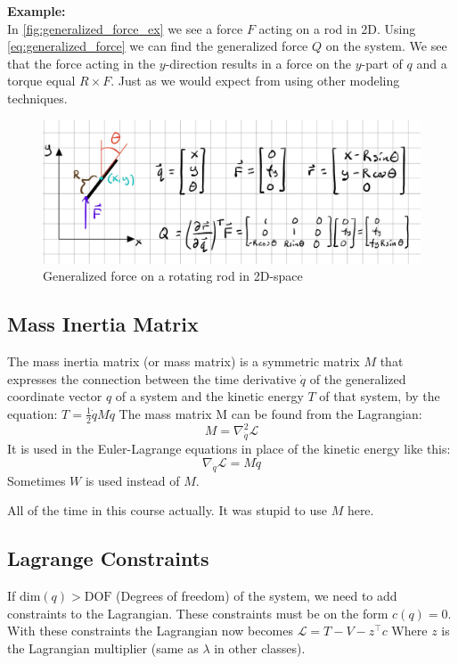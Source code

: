 \textbf{Example:}\\
In \autoref{fig:generalized_force_ex} we see a force $F$ acting on a rod in 2D. Using \autoref{eq:generalized_force} we can find the generalized force $Q$ on the system. We see that the force acting in the $y$-direction results in a force on the $y$-part of $q$ and a torque equal $R\times F$. Just as we would expect from using other modeling techniques.
\begin{figure}[H]
    \centering
    \includegraphics[scale=0.8]{figures/generalized forces example.png}
    \caption{Generalized force on a rotating rod in 2D-space}
    \label{fig:generalized_force_ex}
\end{figure}
\subsection{Mass Inertia Matrix}
The mass inertia matrix (or mass matrix) is a symmetric matrix $M$ that expresses the connection between the time derivative $\dot{q}$ of the generalized coordinate vector $q$ of a system and the kinetic energy $T$ of that system, by the equation:
$T=\frac{1}{2}\dot{q}M\dot{q}$
The mass matrix M can be found from the Lagrangian:
$$M=\nabla_{\dot{q}}^2\mathcal{L}$$
It is used in the Euler-Lagrange equations in place of the kinetic energy like this:
$$\nabla_{\dot{q}}\mathcal{L}=M\dot{q}$$
Sometimes $W$ is used instead of $M$. \\
\begin{tiny}
    All of the time in this course actually. It was stupid to use $M$ here.
\end{tiny}

\subsection{Lagrange Constraints}
If $\text{dim}(q)>\text{DOF}$ (Degrees of freedom) of the system, we need to add constraints to the Lagrangian. These constraints must be on the form $c(q)=0$.
With these constraints the Lagrangian now becomes
$\mathcal{L}=T-V-z^\top c$
Where $z$ is the Lagrangian multiplier (same as $\lambda$ in other classes).

